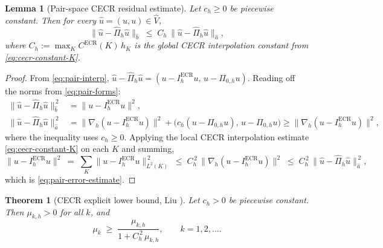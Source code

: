 \documentclass[11pt]{article}
\theoremstyle{plain}
\newtheorem{theorem}{Theorem}
\newtheorem{lemma}{Lemma}
\theoremstyle{definition}
\theoremstyle{remark}
\newcommand{\ECR}{\mathrm{ECR}}
\begin{document}
\begin{lemma}[Pair-space CECR residual estimate]
\label{lem:cecr-pair-residual}
Let $c_h\ge 0$ be piecewise constant. Then for every
$\widehat u=(u,u)\in\widehat V$,
\begin{equation}
\label{eq:pair-error-estimate}
  \|\widehat u-\widehat\Pi_h\widehat u\|_{\widehat b}
  \;\le\; C_h\,\|\widehat u-\widehat\Pi_h\widehat u\|_{\widehat a},
\end{equation}
where $C_h:=\max_K C^{\ECR}(K)\,h_K$ is the global CECR
interpolation constant from \eqref{eq:cecr-constant-K}.
\end{lemma}

\begin{proof}
From \eqref{eq:pair-interp}, $\widehat u-\widehat\Pi_h\widehat u
=(u-I_h^{\ECR}u,\,u-\Pi_{0,h}u)$. Reading off the norms
from \eqref{eq:pair-forms}:
\begin{align*}
  \|\widehat u-\widehat\Pi_h\widehat u\|_{\widehat b}^{\,2}
  &= \|u-I_h^{\ECR}u\|^2, \\
  \|\widehat u-\widehat\Pi_h\widehat u\|_{\widehat a}^{\,2}
  &= \|\nabla_h(u-I_h^{\ECR}u)\|^2
\!   +\! \bigl(c_h(u-\Pi_{0,h}u),\,u-\Pi_{0,h}u\bigr)
  \!\ge\! \|\nabla_h(u-I_h^{\ECR}u)\|^2,
\end{align*}
where the inequality uses $c_h\ge 0$. Applying the local CECR
interpolation estimate \eqref{eq:cecr-constant-K} on each $K$
and summing,
\begin{equation}
\label{eq:ecr-local-L2-to-grad}
  \|u-I_h^{\ECR}u\|^2
  \;=\;\sum_K\|u-I_h^{\ECR}u\|_{L^2(K)}^{\,2}
  \;\le\; C_h^{\,2}\,\|\nabla_h(u-I_h^{\ECR}u)\|^2
  \;\le\; C_h^{\,2}\,\|\widehat u-\widehat\Pi_h\widehat u\|_{\widehat a}^{\,2},
\end{equation}
which is \eqref{eq:pair-error-estimate}.
\end{proof}

\begin{theorem}[CECR explicit lower bound, Liu \cite{Liu2015}]
\label{thm:cecr-abstract}
Let $c_h > 0$ be piecewise constant. Then $\mu_{k,h} >  0$ for
all $k$, and
\begin{equation}
\label{eq:cecr-abstract}
  \mu_k \;\ge\;
  \frac{\mu_{k,h}}{1 + C_h^{\,2}\,\mu_{k,h}},
  \qquad k=1,2,\ldots.
\end{equation}
\end{theorem}
\end{document}

